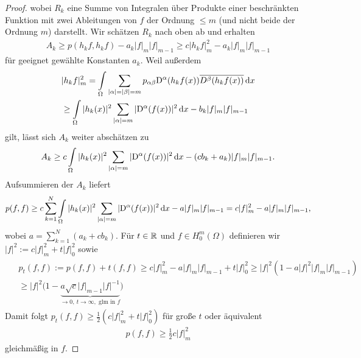 \begin{proof}
wobei $R_k$ eine Summe von Integralen über Produkte einer beschränkten Funktion mit zwei Ableitungen von $f$ der Ordnung $\le m$ (und nicht beide der Ordnung $m$) darstellt.
Wir schätzen $R_k$ nach oben ab und erhalten
\begin{align}
 A_k \ge p(h_kf,h_kf)-a_k\vert f\vert_m\vert f\vert_{m-1} \ge c \vert h_kf\vert_m^2-a_k\vert f\vert_m\vert f\vert_{m-1}
\end{align}
für geeignet gewählte Konstanten $a_k$. Weil außerdem
\begin{align}
\begin{split}
	&\vert h_kf\vert_m^2 = \int\limits_\Omega \sum\limits_{\vert\alpha\vert=\vert\beta\vert=m}p_{\alpha\beta}\mathrm D^\alpha(h_kf(x))\overline{D^\beta(h_kf(x))}\,\mathrm d x \\
	&\ge \int\limits_\Omega \vert h_k(x)\vert^2 \sum\limits_{\vert\alpha\vert=m}\vert \mathrm D^\alpha (f(x))\vert^2 \,\mathrm d x-b_k \vert f\vert_m\vert f\vert_{m-1}
	\end{split}
\end{align}
gilt, lässt sich $A_k$ weiter abschätzen zu
\begin{align}
	A_k \ge c\int\limits_\Omega \vert h_k(x)\vert^2 \sum\limits_{\vert\alpha\vert=m}\vert \mathrm D^\alpha (f(x))\vert^2 \,\mathrm d x-(cb_k+a_k)\vert f\vert_m\vert f\vert_{m-1}.
\end{align}
Aufsummieren der $A_k$ liefert
\begin{align}
	p(f,f) \ge c \sum\limits_{k=1}^N \int\limits_\Omega\vert h_k(x)\vert^2  \sum\limits_{\vert\alpha\vert=m}\vert \mathrm D^\alpha (f(x))\vert^2 \,\mathrm d x-a\vert f\vert_m\vert f\vert_{m-1} =c\vert f\vert_m^2 -a \vert f\vert_m\vert f\vert_{m-1},
\end{align}
wobei $a= \sum_{k=1}^N (a_k+cb_k)$. Für $t\in \mathbb R$ und $f\in H_0^m(\Omega)$ definieren wir $\vert f\vert^2:= c \vert f\vert_m^2+t\vert f\vert_0^2$ sowie
\begin{align}
\begin{split}
	&p_t(f,f) := p(f,f)+t(f,f) \ge c\vert f\vert_m^2-a\vert f\vert_m\vert f\vert_{m-1}+t\vert f\vert_0^2 \ge \vert f\vert^2\left(1-a\vert f\vert^2\vert f\vert_m\vert f\vert_{m-1}\right)\\
	& \ge \vert f\vert^2\big(1-\underbrace{a \sqrt{c}\vert f\vert_{m-1}\vert f\vert^{-1}}_{\rightarrow 0, \ t \rightarrow \infty, \text{ glm in } f}\big)
	\end{split}
\end{align}
Damit folgt $p_t(f,f) \ge \frac{1}{2}\left(c\vert f\vert_m^2+t\vert f\vert_0^2\right)$ für große $t$ oder äquivalent
\begin{align}
	p(f,f) \ge \frac{1}{2}c\vert f\vert_m^2
\end{align}
gleichmäßig in $f$. 
\end{proof}

